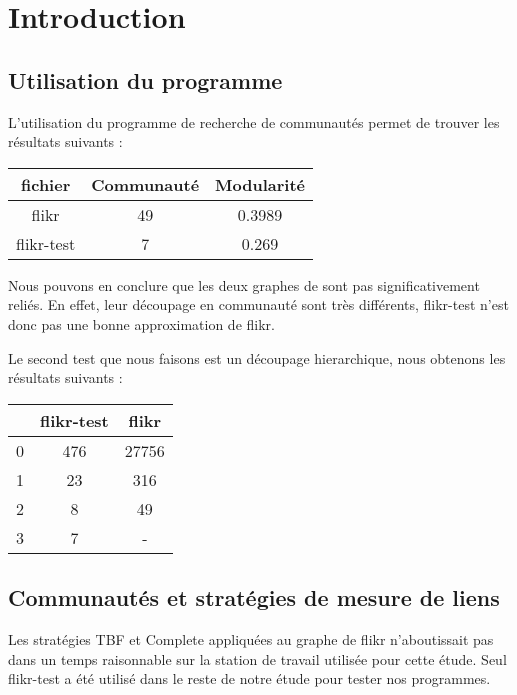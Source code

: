\section{Introduction}

\subsection{Utilisation du programme}

L'utilisation du programme de recherche de communautés permet de trouver
les résultats suivants :

\begin{center}
\begin{tabular}{|c|c|c|}
\hline
  fichier & Communauté & Modularité \\ \hline
  flikr & 49 & 0.3989\\
  flikr-test & 7 & 0.269 \\
\hline
\end{tabular}
\end{center}

Nous pouvons en conclure que les deux graphes de sont pas significativement reliés.
En effet, leur découpage en communauté sont très différents, flikr-test n'est donc
pas une bonne approximation de flikr.

Le second test que nous faisons est un découpage hierarchique, nous obtenons les résultats
suivants :

\begin{center}
\begin{tabular}{|c|c|c|}
\hline
 & flikr-test & flikr \\ \hline
0 & 476 & 27756 \\
1 & 23 & 316 \\
2 & 8 & 49 \\
3 & 7 & - \\
\hline
\end{tabular}
\end{center}


\subsection{Communautés et stratégies de mesure de liens}

Les stratégies TBF et Complete appliquées au graphe de flikr
n'aboutissait pas dans un temps raisonnable
sur la station de travail utilisée pour cette étude. Seul flikr-test
 a été utilisé dans le reste de notre étude pour tester nos programmes.

